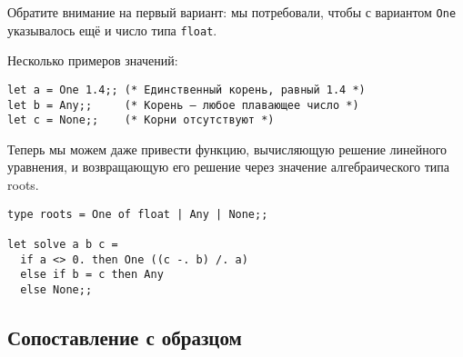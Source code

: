 Обратите внимание на первый вариант: мы потребовали, чтобы с вариантом \verb!One! 
указывалось ещё и число типа \verb!float!.


Несколько примеров значений:

\begin{verbatim}
let a = One 1.4;; (* Единственный корень, равный 1.4 *)
let b = Any;;     (* Корень — любое плавающее число *)
let c = None;;    (* Корни отсутствуют *)
\end{verbatim}

Теперь мы можем даже привести функцию, вычисляющую решение линейного 
уравнения, и возвращающую его решение через значение алгебраического типа roots.

\begin{verbatim}
type roots = One of float | Any | None;;

let solve a b c = 
  if a <> 0. then One ((c -. b) /. a)
  else if b = c then Any
  else None;;
\end{verbatim}



%


\subsection{Сопоставление с образцом}

